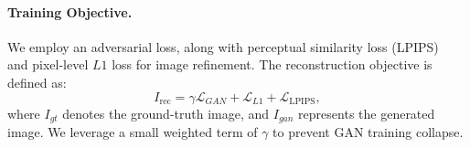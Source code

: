 \paragraph{Training Objective.}
We employ an adversarial loss, along with perceptual similarity loss (LPIPS) ~\cite{lpips} and pixel-level \(L1\) loss for image refinement. The reconstruction objective is defined as:  
\begin{equation}
I_{\text{rec}} = \gamma \mathcal{L}_{GAN} + \mathcal{L}_{L1} + \mathcal{L}_{\text{LPIPS}},
\end{equation}
where \(I_{gt}\) denotes the ground-truth image, and \(I_{gan}\) represents the generated image. We leverage a small weighted term of $\gamma$ to prevent GAN training collapse. 

